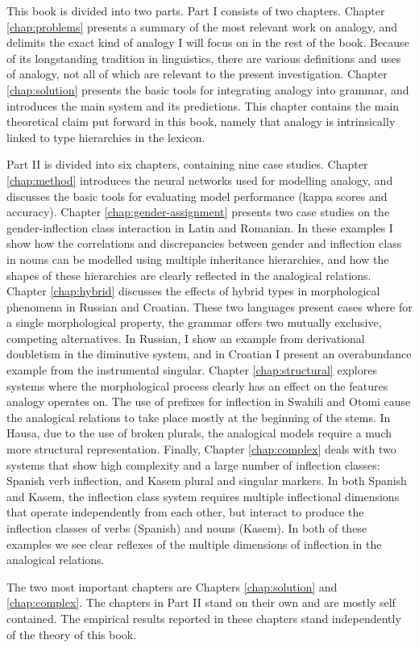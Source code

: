 This book is divided into two parts. Part I consists of two chapters. Chapter \ref{chap:problems} presents a summary of the most relevant work on analogy, and delimits the exact kind of analogy I will focus on in the rest of the book. Because of its longstanding tradition in linguistics, there are various definitions and uses of analogy, not all of which are relevant to the present investigation. Chapter \ref{chap:solution} presents the basic tools for integrating analogy into grammar, and introduces the main system and its predictions. This chapter contains the main theoretical claim put forward in this book, namely that analogy is intrinsically linked to type hierarchies in the lexicon.

Part II is divided into six chapters, containing nine case studies.
Chapter \ref{chap:method} introduces the neural networks used for modelling analogy, and discusses the basic tools for evaluating model performance (kappa scores and accuracy).
Chapter \ref{chap:gender-assignment} presents two case studies on the gender-inflection class interaction in Latin and Romanian. In these examples I show how the correlations and discrepancies between gender and inflection class in nouns can be modelled using multiple inheritance hierarchies, and how the shapes of these hierarchies are clearly reflected in the analogical relations.
Chapter \ref{chap:hybrid} discusses the effects of hybrid types in morphological phenomena in Russian and Croatian. These two languages present cases where for a single morphological property, the grammar offers two mutually exclusive, competing alternatives. In Russian, I show an example from derivational doubletism in the diminutive system, and in Croatian I present an overabundance example from the instrumental singular.
Chapter \ref{chap:structural} explores systems where the morphological process clearly has an effect on the features analogy operates on.
The use of prefixes for inflection in Swahili and Otomi cause the analogical relations to take place mostly at the beginning of the stems.
In Hausa, due to the use of broken plurals, the analogical models require a much more structural representation.
Finally, Chapter \ref{chap:complex} deals with two systems that show high complexity and a large number of inflection classes: Spanish verb inflection, and Kasem plural and singular markers.
In both Spanish and Kasem, the inflection class system requires multiple inflectional dimensions that operate independently from each other, but interact to produce the inflection classes of verbs (Spanish) and nouns (Kasem).
In both of these examples we see clear reflexes of the multiple dimensions of inflection in the analogical relations.

The two most important chapters are Chapters \ref{chap:solution} and \ref{chap:complex}. The chapters in Part II stand on their own and are mostly self contained. The empirical results reported in these chapters stand independently of the theory of this book.

